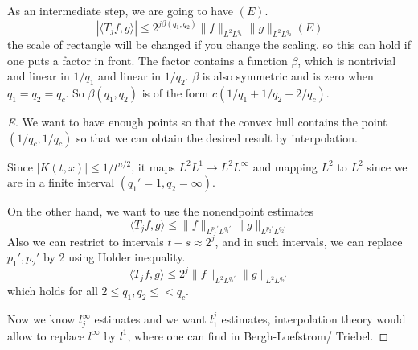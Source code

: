 As an intermediate step, we are going to have $(E)$.
\begin{equation*}
    |\langle T_jf, g\rangle|\leq 2^{j\beta(q_1,q_2)}\|f\|_{L^2L^{q_1}}\|g\|_{L^2L^{q_2}} (E)
\end{equation*}
the scale of rectangle will be changed if you change the scaling, so this can hold if one puts a factor in front. The factor contains a function $\beta$, which is nontrivial and linear in $1/q_1$ and linear in $1/q_2$. $\beta$ is also symmetric and is zero when $q_1=q_2=q_c$. So $\beta(q_1, q_2)$ is of the form $c(1/q_1+1/q_2-2/q_c)$.
\begin{proof}[E]
    We want to have enough points so that the convex hull contains the point $(1/q_c, 1/q_c)$ so that we can obtain the desired result by interpolation.

    Since $|K(t,x)|\leq 1/t^{n/2}$, it maps $L^2L^1\to L^2L^\infty$ and mapping $L^2$ to $L^2$ since we are in a finite interval $(q_1'=1, q_2=\infty)$.

    On the other hand, we want to use the nonendpoint estimates
    \begin{equation*}
        \langle T_jf, g\rangle \leq\|f\|_{L^{p_1'}L^{q_1'}}\|g\|_{L^{p_2'}L^{q_2'}}
    \end{equation*}
    Also we can restrict to intervals $t-s\approx 2^j$, and in such intervals, we can replace $p_1', p_2'$ by 2 using Holder inequality.
    \begin{equation*}
        \langle T_jf, g\rangle\leq 2^j\|f\|_{L^2L^{q_1'}}\|g\|_{L^2L^{q_2'}}
    \end{equation*}
    which holds for all $2\leq q_1,q_2\leq<q_c$.

    Now we know $l_j^\infty$ estimates and we want $l_1^j$ estimates, interpolation theory would allow to replace $l^\infty$ by $l^1$, where one can find in Bergh-Loefstrom/ Triebel.


\end{proof}
